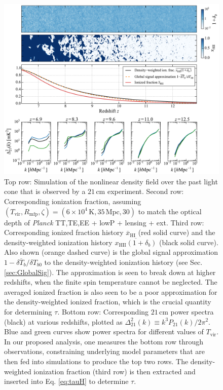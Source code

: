 \documentclass[twocolumn,aps,prd,nofootinbib,showpacs]{revtex4-1}
\begin{document}
\begin{figure}[!]
	\centering
	\includegraphics[width=1.0\textwidth]{figures/lightcones.pdf}
	\caption{Top row: Simulation of the nonlinear density field over the past light cone that is observed by a $21\,\textrm{cm}$ experiment. Second row: Corresponding ionization fraction, assuming $(T_\textrm{vir}, R_\textrm{mfp}, \zeta) = (6 \times 10^4\,\textrm{K}, 35\,\textrm{Mpc}, 30)$ to match the optical depth of \emph{Planck} TT,TE,EE + lowP + lensing + ext. Third row: Corresponding ionized fraction history $\overline{x}_\textrm{HI}$ (red solid curve) and the density-weighted ionization history $\overline{x_\textrm{HII} (1+ \delta_b)}$ (black solid curve). Also shown (orange dashed curve) is the global signal approximation $1 - \overline{\delta T_b} / \delta T_{b0}$ to the density-weighted ionization history (see Sec. \ref{sec:GlobalSig}). The approximation is seen to break down at higher redshifts, when the finite spin temperature cannot be neglected. The averaged ionized fraction is also seen to be a poor approximation for the density-weighted ionized fraction, which is the crucial quantity for determining $\tau$. Bottom row: Corresponding $21\,\textrm{cm}$ power spectra (black) at various redshifts, plotted as $\Delta^2_{21} (k) \equiv k^3 P_{21}(k) / 2 \pi^2$. Blue and green curves show power spectra for different values of $T_\textrm{vir}$. In our proposed analysis, one measures the bottom row through observations, constraining underlying model parameters that are then fed into simulations to produce the top two rows. The density-weighted ionization fraction (third row) is then extracted and inserted into Eq. \eqref{eq:tauH} to determine $\tau$.}
	\label{fig:Simulations}
\end{figure}
\end{document}
